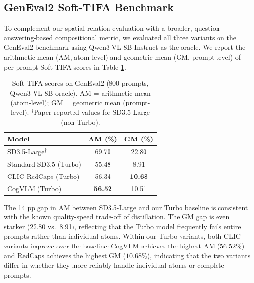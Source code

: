\subsection{GenEval2 Soft-TIFA Benchmark}
To complement our spatial-relation evaluation with a broader, question-answering-based compositional metric, we evaluated all three variants on the GenEval2 benchmark \citep{kamath2025geneval} using Qwen3-VL-8B-Instruct as the oracle. We report the arithmetic mean (AM, atom-level) and geometric mean (GM, prompt-level) of per-prompt Soft-TIFA scores in Table \ref{tab:tifa}.

\begin{table}[ht]
\caption{Soft-TIFA scores on GenEval2 (800 prompts, Qwen3-VL-8B oracle). AM = arithmetic mean (atom-level); GM = geometric mean (prompt-level). $^\dagger$Paper-reported values for SD3.5-Large (non-Turbo).}
\label{tab:tifa}
\begin{center}
\begin{small}
\begin{tabular}{lcc}
\toprule
\textbf{Model} & \textbf{AM (\%)} & \textbf{GM (\%)} \\
\midrule
SD3.5-Large$^\dagger$ \citep{kamath2025geneval} & 69.70 & 22.80 \\
\midrule
Standard SD3.5 (Turbo)  & 55.48 & 8.91  \\
CLIC RedCaps (Turbo)    & 56.34 & \textbf{10.68} \\
CogVLM (Turbo)          & \textbf{56.52} & 10.51 \\
\bottomrule
\end{tabular}
\end{small}
\end{center}
\end{table}

The 14 pp gap in AM between SD3.5-Large and our Turbo baseline is consistent with the known quality-speed trade-off of distillation. The GM gap is even starker (22.80 vs.\ 8.91), reflecting that the Turbo model frequently fails entire prompts rather than individual atoms. Within our Turbo variants, both CLIC variants improve over the baseline: CogVLM achieves the highest AM ($56.52\%$) and RedCaps achieves the highest GM ($10.68\%$), indicating that the two variants differ in whether they more reliably handle individual atoms or complete prompts.